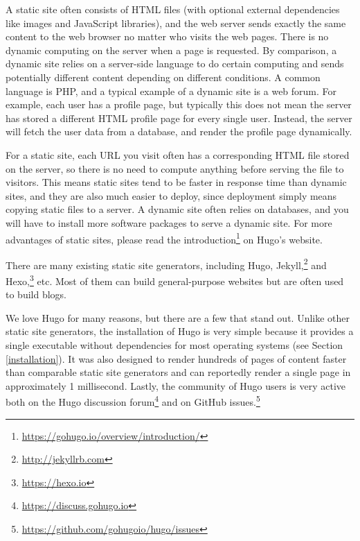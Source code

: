\documentclass[12pt,]{krantz}
\renewcommand{\href}[2]{#2\footnote{\url{#1}}}
\theoremstyle{definition}
\theoremstyle{definition}
\theoremstyle{definition}
\theoremstyle{remark}
\begin{document}
A static site often consists of HTML files (with
optional external dependencies like images and JavaScript libraries),
and the web server sends exactly the same content to the web browser no
matter who visits the web pages. There is no dynamic computing on the
server when a page is requested. By comparison, a dynamic site relies on
a server-side language to do certain computing and sends potentially
different content depending on different conditions. A common language
is PHP, and a typical example of a dynamic site is a web forum. For
example, each user has a profile page, but typically this does not mean
the server has stored a different HTML profile page for every single
user. Instead, the server will fetch the user data from a database, and
render the profile page dynamically.

For a static site, each URL you visit often has a corresponding HTML
file stored on the server, so there is no need to compute anything
before serving the file to visitors. This means static sites tend to be
faster in response time than dynamic sites, and they are also much
easier to deploy, since deployment simply means copying static files to
a server. A dynamic site often relies on databases, and you will have to
install more software packages to serve a dynamic site. For more
advantages of static sites, please read the
\href{https://gohugo.io/overview/introduction/}{introduction} on Hugo's
website.

There are many existing static site generators, including Hugo,
\href{http://jekyllrb.com}{Jekyll,} and \href{https://hexo.io}{Hexo,}
etc. Most of them can build general-purpose websites but are often used
to build blogs.

We love Hugo for many reasons, but there are a few that stand out.
Unlike other static site generators, the installation of Hugo is very
simple because it provides a single executable without dependencies for
most operating systems (see Section \ref{installation}). It was also
designed to render hundreds of pages of content faster than comparable
static site generators and can reportedly render a single page in
approximately 1 millisecond. Lastly, the community of Hugo users is very
active both on the \href{https://discuss.gohugo.io}{Hugo discussion
forum} and on \href{https://github.com/gohugoio/hugo/issues}{GitHub
issues.}
\end{document}
